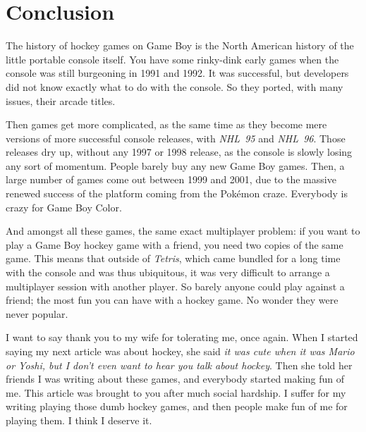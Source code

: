 \documentclass{book}
\begin{document}
\FloatBarrier\needspace{10mm}\section*{Conclusion}\nopagebreak[4]

The history of hockey games on Game Boy is the North American history of the little portable console itself. You have some rinky-dink early games when the console was still burgeoning in 1991 and 1992. It was successful, but developers did not know exactly what to do with the console. So they ported, with many issues, their arcade titles.

Then games get more complicated, as the same time as they become mere versions of more successful console releases, with \emph{NHL 95} and \emph{NHL 96}. Those releases dry up, without any 1997 or 1998 release, as the console is slowly losing any sort of momentum. People barely buy any new Game Boy games. Then, a large number of games come out between 1999 and 2001, due to the massive renewed success of the platform coming from the Pokémon craze. Everybody is crazy for Game Boy Color.

And amongst all these games, the same exact multiplayer problem: if you want to play a Game Boy hockey game with a friend, you need two copies of the same game. This means that outside of \emph{Tetris}, which came bundled for a long time with the console and was thus ubiquitous, it was very difficult to arrange a multiplayer session with another player. So barely anyone could play against a friend; the most fun you can have with a hockey game. No wonder they were never popular.

I want to say thank you to my wife for tolerating me, once again. When I started saying my next article was about hockey, she said \emph{it was cute when it was Mario or Yoshi, but I don’t even want to hear you talk about hockey}. Then she told her friends I was writing about these games, and everybody started making fun of me. This article was brought to you after much social hardship. I suffer for my writing playing those dumb hockey games, and then people make fun of me for playing them. I think I deserve it.
\end{document}
